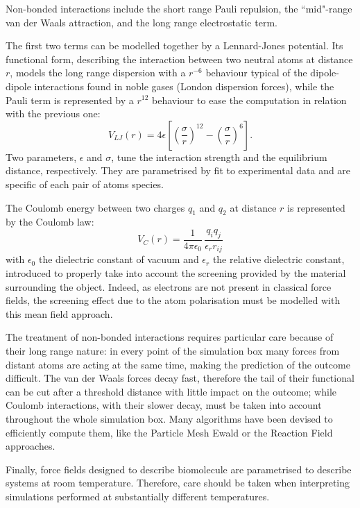 \documentclass[graybox]{svmult}
\begin{document}
Non-bonded interactions include the short range Pauli repulsion, the ``mid"-range van der Waals attraction, and the long range electrostatic term.

The first two terms can be modelled together by a Lennard-Jones potential. Its functional form, describing the interaction between two neutral atoms at distance $r$, models the long range dispersion with a $r^{-6}$ behaviour typical of the dipole-dipole interactions found in noble gases (London dispersion forces), while the Pauli term is represented by a $r^{12}$ behaviour to ease the computation in relation with the previous one:
\begin{equation}
V_{LJ}(r) = 4 \epsilon \left[ \left( \frac{\sigma}{r} \right)^{12} - \left( \frac{\sigma}{r} \right)^6 \right].
\end{equation}
Two parameters, $\epsilon$ and $\sigma$, tune the interaction strength and the equilibrium distance, respectively. They are parametrised by fit to experimental data and are specific of each pair of atoms species.

The Coulomb energy between two charges $q_1$ and $q_2$ at distance $r$ is represented by the Coulomb law:
\begin{equation}
V_C(r) = \frac{1}{4 \pi \epsilon_0} \, \frac{q_i q_j}{\epsilon_r r_{ij}}
\end{equation}
with $\epsilon_0$ the dielectric constant of vacuum and $\epsilon_r$ the relative dielectric constant, introduced to properly take into account the screening provided by the material surrounding the object. Indeed, as electrons are not present in classical force fields, the screening effect due to the atom polarisation must be modelled with this mean field approach.

The treatment of non-bonded interactions requires particular care because of their long range nature: in every point of the simulation box many forces from distant atoms are acting at the same time, making the prediction of the outcome difficult.
%
The van der Waals forces decay fast, therefore the tail of their functional can be cut after a threshold distance with little impact on the outcome; while Coulomb interactions, with their slower decay, must be taken into account throughout the whole simulation box. Many algorithms have been devised to efficiently compute them, like the Particle Mesh Ewald \cite{Essmann1995} or the Reaction Field \cite{Tironi1995} approaches. 

Finally, force fields designed to describe biomolecule are parametrised to describe systems at room temperature. Therefore, care should be taken when interpreting simulations performed at substantially different temperatures.
\end{document}
